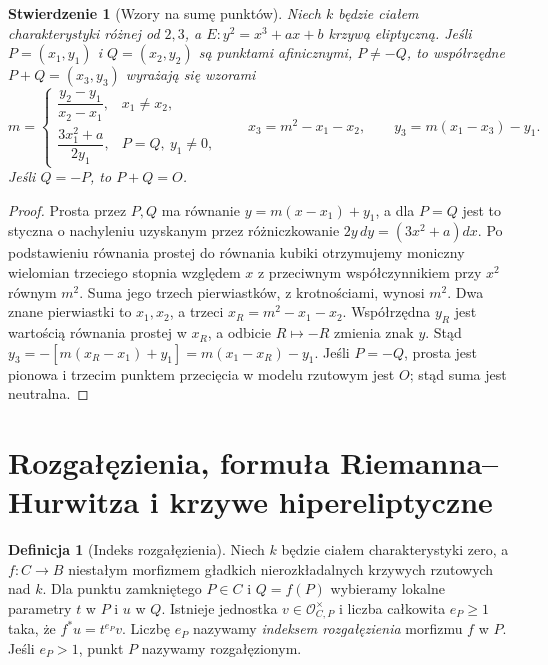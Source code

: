 \documentclass[11pt,a4paper,openany]{report}
\numberwithin{equation}{section}
\theoremstyle{plain}
\newtheorem{stwierdzenie}[twierdzenie]{Stwierdzenie}
\theoremstyle{definition}
\newtheorem{definicja}[twierdzenie]{Definicja}
\theoremstyle{remark}
\begin{document}
\begin{stwierdzenie}[Wzory na sumę punktów]
Niech $k$ będzie ciałem charakterystyki różnej od $2,3$,
a $E:y^2=x^3+ax+b$ krzywą eliptyczną.
Jeśli $P=(x_1,y_1)$ i $Q=(x_2,y_2)$ są punktami
afinicznymi, $P\ne-Q$, to współrzędne
$P+Q=(x_3,y_3)$ wyrażają się wzorami
\[
 m=\begin{cases}
 \dfrac{y_2-y_1}{x_2-x_1},&x_1\ne x_2,\\[4pt]
 \dfrac{3x_1^2+a}{2y_1},&P=Q,\ y_1\ne0,
 \end{cases}
 \qquad x_3=m^2-x_1-x_2,\qquad
 y_3=m(x_1-x_3)-y_1.
\]
Jeśli $Q=-P$, to $P+Q=O$.
\end{stwierdzenie}
\begin{proof}
Prosta przez $P,Q$ ma równanie
$y=m(x-x_1)+y_1$, a dla $P=Q$ jest to
styczna o nachyleniu uzyskanym przez
różniczkowanie $2y\,dy=(3x^2+a)dx$.
Po podstawieniu równania prostej do równania
kubiki otrzymujemy moniczny wielomian trzeciego
stopnia względem $x$ z przeciwnym współczynnikiem
przy $x^2$ równym $m^2$. Suma jego trzech
pierwiastków, z krotnościami, wynosi $m^2$.
Dwa znane pierwiastki to $x_1,x_2$, a trzeci
$x_R=m^2-x_1-x_2$. Współrzędna $y_R$ jest
wartością równania prostej w $x_R$, a odbicie
$R\mapsto-R$ zmienia znak $y$. Stąd
$y_3=-[m(x_R-x_1)+y_1]=m(x_1-x_R)-y_1$.
Jeśli $P=-Q$, prosta jest pionowa i trzecim
punktem przecięcia w modelu rzutowym jest $O$;
stąd suma jest neutralna.
\end{proof}

\section{Rozgałęzienia, formuła Riemanna--Hurwitza i krzywe hipereliptyczne}
\label{sec:hurwitz}

\begin{definicja}[Indeks rozgałęzienia]
Niech $k$ będzie ciałem charakterystyki zero, a
$f:C\to B$ niestałym morfizmem gładkich
nierozkładalnych krzywych rzutowych nad $k$.
Dla punktu zamkniętego $P\in C$ i $Q=f(P)$
wybieramy lokalne parametry $t$ w $P$ i $u$ w $Q$. Istnieje
jednostka $v\in\mathcal O_{C,P}^\times$ i
liczba całkowita $e_P\ge1$ taka, że
$f^*u=t^{e_P}v$. Liczbę $e_P$ nazywamy
\emph{indeksem rozgałęzienia} morfizmu $f$ w $P$.
Jeśli $e_P>1$, punkt $P$ nazywamy rozgałęzionym.
\end{definicja}
\end{document}
